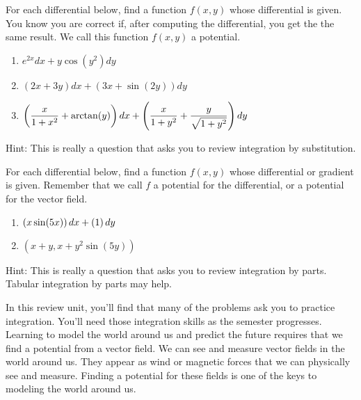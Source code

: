 \begin{problem}
For each differential below, find a function $f(x,y)$ whose differential is given. You know you are correct if, after computing the differential, you get the the same result. We call this function $f(x,y)$ a potential. 
\begin{enumerate}
 \item $e^{2x}dx + y\cos (y^2)dy$
 \item $(2x+3y)dx+(3x+\sin(2y))dy$
 \item $\displaystyle\left(\frac{x}{1+x^2}+\arctan(y)\right)dx + \left(\frac{x}{1+y^2}+\frac{y}{\sqrt{1+y^2}}\right)dy$
\end{enumerate}
 Hint: This is really a question that asks you to review integration by substitution. 
\end{problem}


\begin{problem}
 For each differential below, find a function $f(x,y)$ whose differential or gradient is given. Remember that we call $f$ a potential for the differential, or a potential for the vector field. 
\begin{enumerate}
 \item $\displaystyle\left(x\sin(5x)\right)dx + \left(1\right)dy$
 \item $\left(x+y,x+y^2\sin(5y)\right)$
\end{enumerate}
%
Hint: This is really a question that asks you to review integration by parts. Tabular integration by parts may help.
\end{problem}

In this review unit, you'll find that many of the problems ask you to practice integration.  You'll need those integration skills as the semester progresses. Learning to model the world around us and predict the future requires that we find a potential from a vector field. We can see and measure vector fields in the world around us. They appear as wind or magnetic forces that we can physically see and measure. Finding a potential for these fields is one of the keys to modeling the world around us.

\subsection*{\ideaD}

